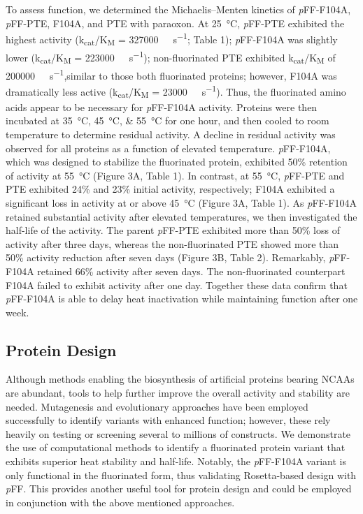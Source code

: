 \begin{refsection}
To assess function, we determined the Michaelis–Menten kinetics of
\emph{p}FF-F104A, \emph{p}FF-PTE, F104A, and PTE with paraoxon. At
\SI{25}{\celsius}, \emph{p}FF-PTE exhibited the highest activity
(k\textsubscript{cat}/K\textsubscript{M} = \SI{327000}{\per\Molar\per\second};
Table 1); \emph{p}FF-F104A was slightly lower
(k\textsubscript{cat}/K\textsubscript{M} = \SI{223000}{\per\Molar\per\second});
non-fluorinated PTE exhibited k\textsubscript{cat}/K\textsubscript{M} of
\SI{200000}{\per\Molar\per\second},similar to those both fluorinated proteins;
however, F104A was dramatically less active
(k\textsubscript{cat}/K\textsubscript{M} = \SI{23000}{\per\Molar\per\second}). Thus, the
fluorinated amino acids appear to be necessary for \emph{p}FF-F104A activity.
Proteins were then incubated at \SIlist{35;45;55}{\celsius} for one hour, and
then cooled to room temperature to determine residual activity. A decline in
residual activity was observed for all proteins as a function of elevated
temperature. \emph{p}FF-F104A, which was designed to stabilize the fluorinated
protein, exhibited 50\% retention of activity at \SI{55}{\celsius} (Figure 3A,
Table 1). In contrast, at \SI{55}{\celsius}, \emph{p}FF-PTE and PTE exhibited
24\% and 23\% initial activity, respectively; F104A exhibited a significant
loss in activity at or above \SI{45}{\celsius} (Figure 3A, Table 1). As
\emph{p}FF-F104A retained substantial activity after elevated temperatures, we
then investigated the half-life of the activity. The parent \emph{p}FF-PTE
exhibited more than 50\% loss of activity after three days, whereas the
non-fluorinated PTE showed more than 50\% activity reduction after seven days
(Figure 3B, Table 2). Remarkably, \emph{p}FF-F104A retained 66\% activity after
seven days. The non-fluorinated counterpart F104A failed to exhibit activity
after one day. Together these data confirm that \emph{p}FF-F104A is able to
delay heat inactivation while maintaining function after one week.

\subsection{Protein Design}

Although methods enabling the biosynthesis of artificial proteins bearing NCAAs
are abundant,\cite{Voloshchuk2009} tools to help further improve the overall
activity and stability are needed. Mutagenesis and evolutionary approaches have
been employed successfully to identify variants with enhanced function;
however, these rely heavily on testing or screening several to millions of
constructs.\cite{Voloshchuk2007b,Montclare2006b,Yoo2007} We demonstrate the use
of computational methods to identify a fluorinated protein variant that
exhibits superior heat stability and half-life. Notably, the \emph{p}FF-F104A
variant is only functional in the fluorinated form, thus validating
Rosetta-based design with \emph{p}FF. This provides another useful tool for
protein design and could be employed in conjunction with the above mentioned
approaches.

\printbibliography[heading=subbibliography]

\end{refsection}
